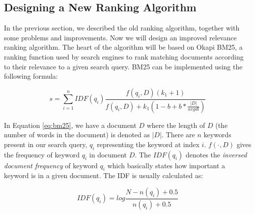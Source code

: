 \subsection{Designing a New Ranking Algorithm}
In the previous section, we described the old ranking algorithm, together with some problems and improvements. Now we will design an improved relevance ranking algorithm. The heart of the algorithm will be based on Okapi BM25, a ranking function used by search engines to rank matching documents according to their relevance to a given search query\cite{jones2000probabilistic}. BM25 can be implemented using the following formula:

\begin{equation}
\label{eq:bm25}
s = \sum_{i=1}^{n} IDF(q_i) \frac{f(q_i, D)(k_1 + 1)}{f(q_i, D) + k_1 (1 - b + b * \frac{|D|}{avgdl})}
\end{equation}

In Equation \ref{eq:bm25}, we have a document $ D $ where the length of $ D $ (the number of words in the document) is denoted as $ |D| $. There are $ n $ keywords present in our search query, $ q_i $ representing the keyword at index $ i $. $ f(\cdot, D) $ gives the frequency of keyword $ q_i $ in document $ D $. The $ IDF(q_i) $ denotes the \emph{inversed document frequency} of keyword $ q_i $ which basically states how important a keyword is in a given document. The IDF is usually calculated as:

\begin{equation}
\label{eq:bm25-idf}
IDF(q_i) = log\frac{N - n(q_i) + 0.5}{n(q_i) + 0.5}
\end{equation}

